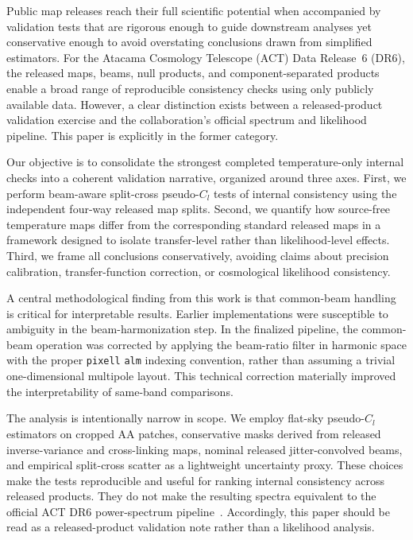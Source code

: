 \documentclass[twocolumn,showpacs,preprintnumbers,amsmath,amssymb,floatfix,prd]{revtex4-2}
\def\ell{l}%
\begin{document}
Public map releases reach their full scientific potential when accompanied by validation tests that are rigorous enough to guide downstream analyses yet conservative enough to avoid overstating conclusions drawn from simplified estimators.
For the Atacama Cosmology Telescope (ACT) Data Release~6 (DR6), the released maps, beams, null products, and component-separated products~\cite{Naess2025,Louis2025,Calabrese2025,Coulton2024} enable a broad range of reproducible consistency checks using only publicly available data.
However, a clear distinction exists between a released-product validation exercise and the collaboration's official spectrum and likelihood pipeline.
This paper is explicitly in the former category.

Our objective is to consolidate the strongest completed temperature-only internal checks into a coherent validation narrative, organized around three axes.
First, we perform beam-aware split-cross pseudo-$C_\ell$ tests of internal consistency using the independent four-way released map splits.
Second, we quantify how source-free temperature maps differ from the corresponding standard released maps in a framework designed to isolate transfer-level rather than likelihood-level effects.
Third, we frame all conclusions conservatively, avoiding claims about precision calibration, transfer-function correction, or cosmological likelihood consistency.

A central methodological finding from this work is that common-beam handling is critical for interpretable results.
Earlier implementations were susceptible to ambiguity in the beam-harmonization step.
In the finalized pipeline, the common-beam operation was corrected by applying the beam-ratio filter in harmonic space with the proper \texttt{pixell} \texttt{alm} indexing convention, rather than assuming a trivial one-dimensional multipole layout.
This technical correction materially improved the interpretability of same-band comparisons.

The analysis is intentionally narrow in scope.
We employ flat-sky pseudo-$C_\ell$ estimators on cropped AA patches, conservative masks derived from released inverse-variance and cross-linking maps, nominal released jitter-convolved beams, and empirical split-cross scatter as a lightweight uncertainty proxy.
These choices make the tests reproducible and useful for ranking internal consistency across released products.
They do not make the resulting spectra equivalent to the official ACT DR6 power-spectrum pipeline~\cite{Louis2025}.
Accordingly, this paper should be read as a released-product validation note rather than a likelihood analysis.
\end{document}
